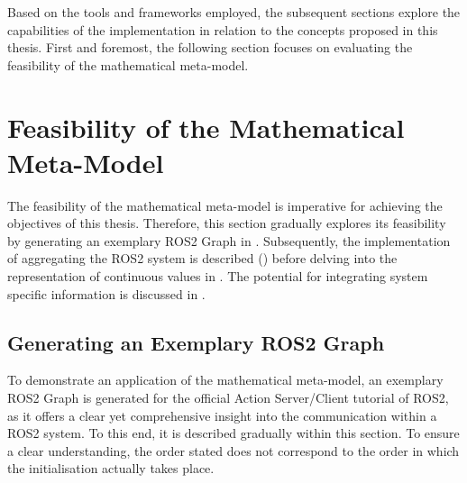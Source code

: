 Based on the tools and frameworks employed, the subsequent sections explore the capabilities of the implementation in relation to the concepts proposed in this thesis. First and foremost, the following section focuses on evaluating the feasibility of the mathematical meta-model.


\section{Feasibility of the Mathematical Meta-Model} \label{sec:evaluation:mathmetamodel}
    The feasibility of the mathematical meta-model is imperative for achieving the objectives of this thesis. Therefore, this section gradually explores its feasibility by generating an exemplary ROS2 Graph in . Subsequently, the implementation of aggregating the ROS2 system is described () before delving into the representation of continuous values in . The potential for integrating system specific information is discussed in .
    
    \vspace{-.125cm}
    \subsection{Generating an Exemplary ROS2 Graph} \label{subsec:eval:actionExample}
    \vspace{-.125cm}
    To demonstrate an application of the mathematical meta-model, an exemplary ROS2 Graph is generated for the official Action Server/Client tutorial \cite{website:acttutorial} of ROS2, as it offers a clear yet comprehensive insight into the communication within a ROS2 system. To this end, it is described gradually within this section. To ensure a clear understanding, the order stated does not correspond to the order in which the initialisation actually takes place.

